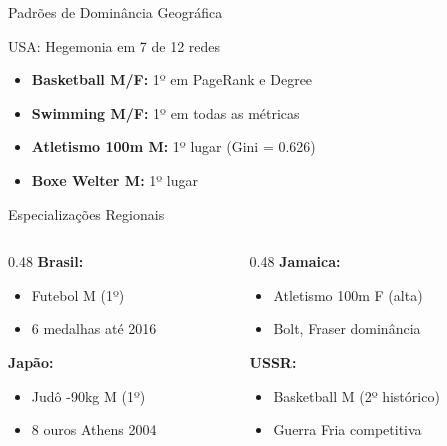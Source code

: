 \begin{frame}[shrink=12]{Padrões de Dominância Geográfica}
    \begin{block}{USA: Hegemonia em 7 de 12 redes}
        \footnotesize
        \begin{itemize}
            \item \textbf{Basketball M/F:} 1º em PageRank e Degree
            \item \textbf{Swimming M/F:} 1º em todas as métricas
            \item \textbf{Atletismo 100m M:} 1º lugar (Gini = 0.626)
            \item \textbf{Boxe Welter M:} 1º lugar
        \end{itemize}
    \end{block}

    \vspace{0.3cm}

    \begin{block}{Especializações Regionais}
        \footnotesize
        \begin{columns}[T]
            \begin{column}{0.48\textwidth}
                \textbf{Brasil:}
                \begin{itemize}
                    \item Futebol M (1º)
                    \item 6 medalhas até 2016
                \end{itemize}

                \vspace{0.2cm}
                \textbf{Japão:}
                \begin{itemize}
                    \item Judô -90kg M (1º)
                    \item 8 ouros Athens 2004
                \end{itemize}
            \end{column}
            \begin{column}{0.48\textwidth}
                \textbf{Jamaica:}
                \begin{itemize}
                    \item Atletismo 100m F (alta)
                    \item Bolt, Fraser dominância
                \end{itemize}

                \vspace{0.2cm}
                \textbf{USSR:}
                \begin{itemize}
                    \item Basketball M (2º histórico)
                    \item Guerra Fria competitiva
                \end{itemize}
            \end{column}
        \end{columns}
    \end{block}


\end{frame}
